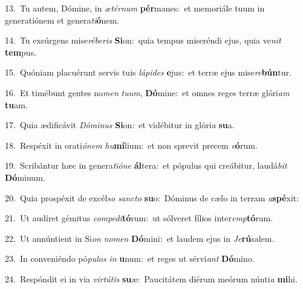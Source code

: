 {\numbfont\textcolor{\numbcolor}{13.}}~Tu autem, Dómine, in \textit{æ}\-\textit{tér}\textit{num} \textbf{pér}\-manes:~\star et memoriále tuum in generatiónem et genera\-\textit{ti}\-\textbf{ó}nem.\par
{\numbfont\textcolor{\numbcolor}{14.}}~Tu exsúrgens mise\-\textit{ré}\-\textit{be}\textit{ris} \textbf{Si}\-on:~\star quia tempus miseréndi ejus, quia ve\textit{nit} \textbf{tem}\-pus.\par
{\numbfont\textcolor{\numbcolor}{15.}}~Quóniam placuérunt servis tuis \textit{lá}\-\textit{pi}\textit{des} \textbf{e}\-jus:~\star et terræ ejus mise\-\textit{re}\-\textbf{bún}tur.\par
{\numbfont\textcolor{\numbcolor}{16.}}~Et timébunt gentes no\textit{men} \textit{tu}\-\textit{um}, \textbf{Dó}\-mine:~\star et omnes reges terræ glóri\textit{am} \textbf{tu}\-am.\par
{\numbfont\textcolor{\numbcolor}{17.}}~Quia ædificávit \textit{Dó}\-\textit{mi}\textit{nus} \textbf{Si}\-on:~\star et vidébitur in glóri\textit{a} \textbf{su}\-a.\par
{\numbfont\textcolor{\numbcolor}{18.}}~Respéxit in orati\-\textit{ó}\-\textit{nem} \textit{hu}\-\textbf{mí}lium:~\star et non sprevit precem \textit{e}\-\textbf{ó}rum.\par
{\numbfont\textcolor{\numbcolor}{19.}}~Scribántur hæc in genera\-\textit{ti}\-\textit{ó}\textit{ne} \textbf{ál}\-tera:~\star et pópulus qui creábitur, laudá\textit{bit} \textbf{Dó}\-minum.\par
{\numbfont\textcolor{\numbcolor}{20.}}~Quia prospéxit de excél\textit{so} \textit{sanc}\-\textit{to} \textbf{su}\-o:~\star Dóminus de cælo in terram \textit{a}\-\textbf{spé}xit:\par
{\numbfont\textcolor{\numbcolor}{21.}}~Ut audíret gémitus \textit{com}\-\textit{pe}\textit{di}\textbf{tó}rum:~\star ut sólveret fílios inter\-\textit{emp}\-\textbf{tó}rum.\par
{\numbfont\textcolor{\numbcolor}{22.}}~Ut annúntient in Si\textit{on} \textit{no}\-\textit{men} \textbf{Dó}\-mini:~\star et laudem ejus in \textit{Je}\-\textbf{rú}salem.\par
{\numbfont\textcolor{\numbcolor}{23.}}~In conveniéndo pó\-\textit{pu}\-\textit{los} \textit{in} \textbf{u}\-num:~\star et reges ut sérvi\textit{ant} \textbf{Dó}\-mino.\par
{\numbfont\textcolor{\numbcolor}{24.}}~Respóndit ei in via \textit{vir}\-\textit{tú}\textit{tis} \textbf{su}\-æ:~\star Paucitátem diérum meórum núnti\textit{a} \textbf{mi}\-hi.\par
